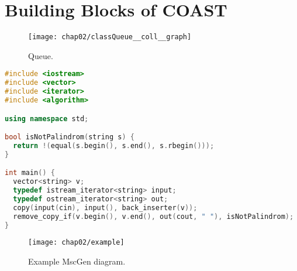 \chapter{Building Blocks of COAST}\label{BuildingBlocks}

\begin{figure}[hbt]
  \centering
  \texttt{[image: chap02/classQueue\_\_coll\_\_graph]}
  \caption{Queue.}
  \label{fig:queue}
\end{figure}

\begin{lstlisting}[language=C++, caption=Example Source]
#include <iostream>
#include <vector>
#include <iterator>
#include <algorithm>

using namespace std;

bool isNotPalindrom(string s) {
  return !(equal(s.begin(), s.end(), s.rbegin()));
}

int main() {
  vector<string> v;
  typedef istream_iterator<string> input;
  typedef ostream_iterator<string> out;
  copy(input(cin), input(), back_inserter(v));
  remove_copy_if(v.begin(), v.end(), out(cout, " "), isNotPalindrom);
}
\end{lstlisting}

\begin{figure}[hbt]
  \centering
  \texttt{[image: chap02/example]}
  \caption{Example MscGen diagram.}
  \label{fig:queue}
\end{figure}
